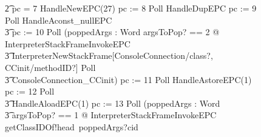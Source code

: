 \begin{figure}[tp!]
{\begin{circus}
    \t2 {} \circelse pc = 7 \circthen HandleNewEPC(27) \circseq pc := 8 \circseq Poll \circseq HandleDupEPC \circseq pc := 9 \circseq  Poll \circseq HandleAconst\_nullEPC \circseq \\
    \t3 pc := 10 \circseq Poll \circseq (\circvar poppedArgs : Word \circspot  \lschexpract \exists argsToPop? == 2 @ InterpreterStackFrameInvokeEPC \rschexpract \circseq \\
    \t3 \lschexpract InterpreterNewStackFrame[ConsoleConnection/class?, CCinit/methodID?] \rschexpract \circseq Poll \circseq \\
    \t3 ConsoleConnection\_CCinit) \circseq pc := 11 \circseq Poll \circseq HandleAstoreEPC(1) \circseq pc := 12 \circseq Poll \circseq \\
    \t3 HandleAloadEPC(1) \circseq pc := 13 \circseq Poll \circseq (\circvar poppedArgs : Word \circspot \\
    \t3 \lschexpract \exists argsToPop? == 1 @ InterpreterStackFrameInvokeEPC \rschexpract \circseq getClassIDOf!head~poppedArgs?cid \then {} \\

\end{circus}}
\end{figure}
